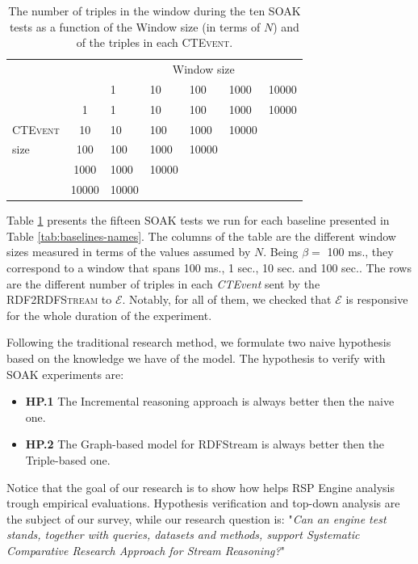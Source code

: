 \begin{table}[htb]
\centering
 \begin{tabular}{l|c| lllll}
	  	\hline
		\multicolumn{2}{c|}{  } &\multicolumn{5}{c}{Window size}  \\
		\multicolumn{2}{c|}{  } & 1 & 10 & 100 &1000 &10000\\
		\hline
		\hline
		 & 1 & 1 & 10 & 100 & 1000&10000 \\
		\textsc{CTEvent}      & 10  & 10  & 100  & 1000 & 10000  \\
		size             &100   & 100   & 1000 & 10000  \\
					&1000   & 1000 & 10000 \\
					&10000   & 10000  \\
		\hline 
	\end{tabular}
	
	 \vspace{10pt}
	\caption{The number of triples in the window during the ten SOAK tests as a function of the Window size (in terms of $N$) and of the triples in each \textsc{CTEvent}.}
	\label{tab:soaktests}
\end{table}

Table \ref{tab:soaktests} presents the fifteen SOAK tests we run for each baseline presented in Table \ref{tab:baselines-names}. The columns of the table are the different window sizes measured in terms of the values assumed by $N$.  Being $\beta=$ 100 ms., they correspond to a window that spans 100 ms., 1 sec., 10 sec. and 100 sec.. The rows are the different number of triples in each \textit{CTEvent} sent by the \textsc{RDF2RDFStream} to $\mathcal{E}$. Notably, for all of them, we checked that $\mathcal{E}$ is responsive for the whole duration of the experiment. 

Following the traditional research method, we formulate two naive hypothesis based on the knowledge we have of the model. The hypothesis to verify with SOAK experiments are:
\begin{itemize}
\item \textbf{HP.1} The Incremental reasoning approach is always better then the naive one.
\item \textbf{HP.2} The Graph-based model for RDFStream is always better then the Triple-based one.
\end{itemize}

Notice that the goal of our research is to show how \name helps RSP Engine analysis trough empirical evaluations. Hypothesis verification and top-down analysis are the subject of our survey, while our research question is:  "\textit{Can an engine test stands, together with queries, datasets and methods, support Systematic Comparative Research Approach for Stream Reasoning?}" %

